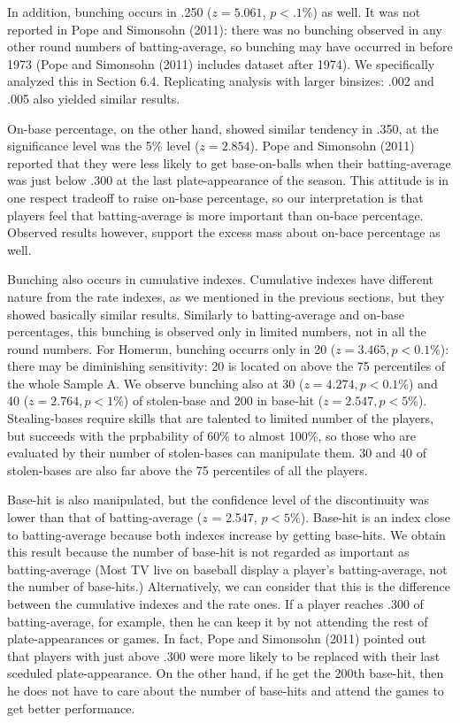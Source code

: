 \documentclass[dvipdfmx, 12pt]{article}
\begin{document}
In addition, bunching occurs in .250 ($z = 5.061$, $p < .1\%$) as well. It was not reported in Pope and Simonsohn (2011): there was no bunching observed in any other round numbers of batting-average, so bunching may have occurred in before 1973 (Pope and Simonsohn (2011) includes dataset after 1974). We specifically analyzed this in Section 6.4. Replicating analysis with larger binsizes: .002 and .005 also yielded similar results.

On-base percentage, on the other hand, showed similar tendency in .350, at the significance level was the 5\% level ($z=2.854$). Pope and Simonsohn (2011) reported that they were less likely to get base-on-balls when their batting-average was just below .300 at the last plate-appearance of the season. This attitude is in one respect tradeoff to raise on-base percentage, so our interpretation is that players feel that batting-average is more important than on-bace percentage. Observed results however, support the excess mass about on-bace percentage as well.

Bunching also occurs in cumulative indexes. Cumulative indexes have different nature from the rate indexes, as we mentioned in the previous sections, but they showed basically similar results. Similarly to batting-average and on-base percentages, this bunching is observed only in limited numbers, not in all the round numbers. For Homerun, bunching occurrs only in 20 ($z=3.465, p < 0.1\%$): there may be diminishing sensitivity: 20 is located on above the 75 percentiles of the whole Sample A. We observe bunching also at 30 ($z=4.274, p < 0.1\%$) and 40 ($z=2.764, p < 1\%$) of stolen-base and 200 in base-hit ($z=2.547, p < 5\%$). Stealing-bases require skills that are talented to limited number of the players, but succeeds with the prpbability of 60\% to almost 100\%, so those who are evaluated by their number of stolen-bases can manipulate them. 30 and 40 of stolen-bases are also far above the 75 percentiles of all the players.

Base-hit is also manipulated, but the confidence level of the discontinuity was lower than that of batting-average ($z$ = 2.547, $p < 5\%$). Base-hit is an index close to batting-average because both indexes increase by getting base-hits. We obtain this result because the number of base-hit is not regarded as important as batting-average (Most TV live on baseball display a player's batting-average, not the number of base-hits.) Alternatively, we can consider that this is the difference between the cumulative indexes and the rate ones. If a player reaches .300 of batting-average, for example, then he can keep it by not attending the rest of plate-appearances or games. In fact, Pope and Simonsohn (2011) pointed out that players with just above .300 were more likely to be replaced with their last sceduled plate-appearance. On the other hand, if he get the 200th base-hit, then he does not have to care about the number of base-hits and attend the games to get better performance.
\end{document}
